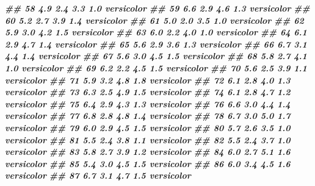 \documentclass[
]{book}
\newenvironment{Shaded}{\begin{snugshade}}{\end{snugshade}}
\newcommand{\DocumentationTok}[1]{\textcolor[rgb]{0.56,0.35,0.01}{\textbf{\textit{#1}}}}
\begin{document}
\begin{Shaded}
\begin{Highlighting}[]
\DocumentationTok{\#\# 58           4.9         2.4          3.3         1.0 versicolor}
\DocumentationTok{\#\# 59           6.6         2.9          4.6         1.3 versicolor}
\DocumentationTok{\#\# 60           5.2         2.7          3.9         1.4 versicolor}
\DocumentationTok{\#\# 61           5.0         2.0          3.5         1.0 versicolor}
\DocumentationTok{\#\# 62           5.9         3.0          4.2         1.5 versicolor}
\DocumentationTok{\#\# 63           6.0         2.2          4.0         1.0 versicolor}
\DocumentationTok{\#\# 64           6.1         2.9          4.7         1.4 versicolor}
\DocumentationTok{\#\# 65           5.6         2.9          3.6         1.3 versicolor}
\DocumentationTok{\#\# 66           6.7         3.1          4.4         1.4 versicolor}
\DocumentationTok{\#\# 67           5.6         3.0          4.5         1.5 versicolor}
\DocumentationTok{\#\# 68           5.8         2.7          4.1         1.0 versicolor}
\DocumentationTok{\#\# 69           6.2         2.2          4.5         1.5 versicolor}
\DocumentationTok{\#\# 70           5.6         2.5          3.9         1.1 versicolor}
\DocumentationTok{\#\# 71           5.9         3.2          4.8         1.8 versicolor}
\DocumentationTok{\#\# 72           6.1         2.8          4.0         1.3 versicolor}
\DocumentationTok{\#\# 73           6.3         2.5          4.9         1.5 versicolor}
\DocumentationTok{\#\# 74           6.1         2.8          4.7         1.2 versicolor}
\DocumentationTok{\#\# 75           6.4         2.9          4.3         1.3 versicolor}
\DocumentationTok{\#\# 76           6.6         3.0          4.4         1.4 versicolor}
\DocumentationTok{\#\# 77           6.8         2.8          4.8         1.4 versicolor}
\DocumentationTok{\#\# 78           6.7         3.0          5.0         1.7 versicolor}
\DocumentationTok{\#\# 79           6.0         2.9          4.5         1.5 versicolor}
\DocumentationTok{\#\# 80           5.7         2.6          3.5         1.0 versicolor}
\DocumentationTok{\#\# 81           5.5         2.4          3.8         1.1 versicolor}
\DocumentationTok{\#\# 82           5.5         2.4          3.7         1.0 versicolor}
\DocumentationTok{\#\# 83           5.8         2.7          3.9         1.2 versicolor}
\DocumentationTok{\#\# 84           6.0         2.7          5.1         1.6 versicolor}
\DocumentationTok{\#\# 85           5.4         3.0          4.5         1.5 versicolor}
\DocumentationTok{\#\# 86           6.0         3.4          4.5         1.6 versicolor}
\DocumentationTok{\#\# 87           6.7         3.1          4.7         1.5 versicolor}

\end{Highlighting}
\end{Shaded}
\end{document}
